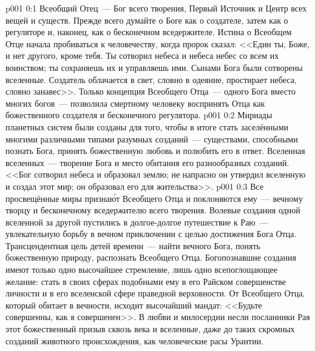 \author{Божественный Советник}
\vs p001 0:1 Всеобщий Отец~--- Бог всего творения, Первый Источник и Центр всех вещей и существ. Прежде всего думайте о Боге как о создателе, затем как о регуляторе и, наконец, как о бесконечном вседержителе. Истина о Всеобщем Отце начала пробиваться к человечеству, когда пророк сказал: <<Един ты, Боже, и нет другого, кроме тебя. Ты сотворил небеса и небеса небес со всем их воинством; ты сохраняешь их и управляешь ими. Сынами Бога были сотворены вселенные. Создатель облачается в свет, словно в одеяние, простирает небеса, словно занавес>>. Только концепция Всеобщего Отца~--- одного Бога вместо многих богов~--- позволила смертному человеку воспринять Отца как божественного создателя и бесконечного регулятора.
\vs p001 0:2 Мириады планетных систем были созданы для того, чтобы в итоге стать заселёнными многими различными типами разумных созданий~--- существами, способными познать Бога, принять божественную любовь и полюбить его в ответ. Вселенная вселенных~--- творение Бога и место обитания его разнообразных созданий. <<Бог сотворил небеса и образовал землю; не напрасно он утвердил вселенную и создал этот мир; он образовал его для жительства>>.
\vs p001 0:3 Все просвещённые миры призна\'ют Всеобщего Отца и поклоняются ему~--- вечному творцу и бесконечному вседержителю всего творения. Волевые создания одной вселенной за другой пустились в долгое\hyp{}долгое путешествие к Раю~--- увлекательную борьбу в вечном приключении с целью достижения Бога Отца. Трансцендентная цель детей времени~--- найти вечного Бога, понять божественную природу, распознать Всеобщего Отца. Богопознавшие создания имеют только одно высочайшее стремление, лишь одно всепоглощающее желание: стать в своих сферах подобными ему в его Райском совершенстве личности и в его вселенской сфере праведной верховности. От Всеобщего Отца, который обитает в вечности, исходит высочайший мандат: <<Будьте совершенны, как я совершенен>>. В любви и милосердии несли посланники Рая этот божественный призыв сквозь века и вселенные, даже до таких скромных созданий животного происхождения, как человеческие расы Урантии.

